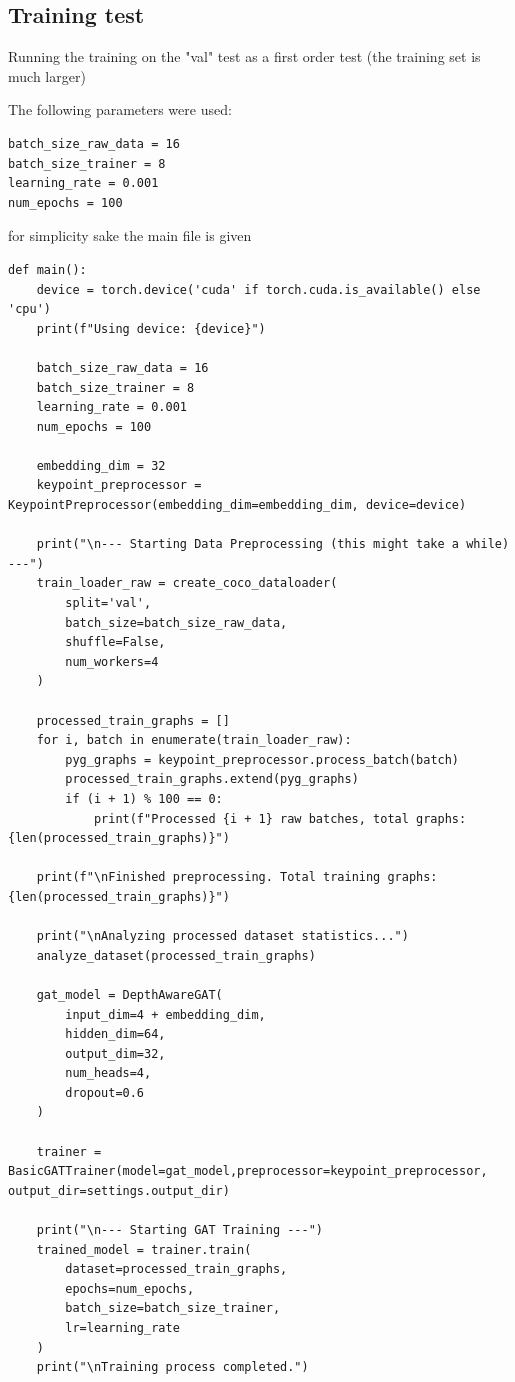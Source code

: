 \subsection{Training test}

Running the training on the "val" test as a first order test (the training set is much larger)

The following parameters were used:

\begin{lstlisting}[style=pythonstyle,title={First training test},label={code:first_training_test}]
batch_size_raw_data = 16
batch_size_trainer = 8
learning_rate = 0.001
num_epochs = 100
\end{lstlisting}

for simplicity sake the main file is given

\begin{lstlisting}[style=pythonstyle,title={Basic training main for recreation later},label={code:basic_training_main}]
def main():
    device = torch.device('cuda' if torch.cuda.is_available() else 'cpu')
    print(f"Using device: {device}")

    batch_size_raw_data = 16
    batch_size_trainer = 8
    learning_rate = 0.001
    num_epochs = 100
    
    embedding_dim = 32
    keypoint_preprocessor = KeypointPreprocessor(embedding_dim=embedding_dim, device=device)
    
    print("\n--- Starting Data Preprocessing (this might take a while) ---")
    train_loader_raw = create_coco_dataloader(
        split='val',
        batch_size=batch_size_raw_data,
        shuffle=False,
        num_workers=4
    )
    
    processed_train_graphs = []
    for i, batch in enumerate(train_loader_raw):
        pyg_graphs = keypoint_preprocessor.process_batch(batch)
        processed_train_graphs.extend(pyg_graphs)
        if (i + 1) % 100 == 0:
            print(f"Processed {i + 1} raw batches, total graphs: {len(processed_train_graphs)}")

    print(f"\nFinished preprocessing. Total training graphs: {len(processed_train_graphs)}")
    
    print("\nAnalyzing processed dataset statistics...")
    analyze_dataset(processed_train_graphs)

    gat_model = DepthAwareGAT(
        input_dim=4 + embedding_dim,
        hidden_dim=64,
        output_dim=32,
        num_heads=4,
        dropout=0.6
    )

    trainer = BasicGATTrainer(model=gat_model,preprocessor=keypoint_preprocessor, output_dir=settings.output_dir)

    print("\n--- Starting GAT Training ---")
    trained_model = trainer.train(
        dataset=processed_train_graphs,
        epochs=num_epochs,
        batch_size=batch_size_trainer,
        lr=learning_rate
    )
    print("\nTraining process completed.")
\end{lstlisting}

